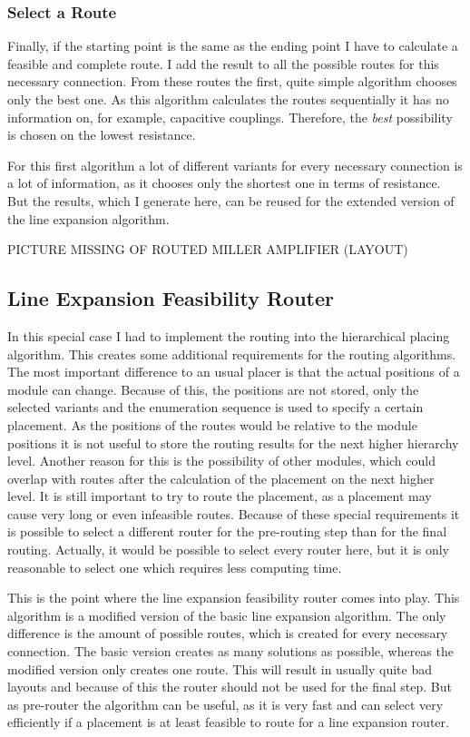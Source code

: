 \subsubsection{Select a Route}
Finally, if the starting point is the same as the ending point I have to calculate a feasible and complete route. I add the result to all the possible routes for this necessary connection. From these routes the first, quite simple algorithm chooses only the best one. As this algorithm calculates the routes sequentially it has no information on, for example, capacitive couplings. Therefore, the \emph{best} possibility is chosen on the lowest resistance.

For this first algorithm a lot of different variants for every necessary connection is a lot of information, as it chooses only the shortest one in terms of resistance. But the results, which I generate here, can be reused for the extended version of the line expansion algorithm.

PICTURE MISSING OF ROUTED MILLER AMPLIFIER (LAYOUT)

\subsection{Line Expansion Feasibility Router}
In this special case I had to implement the routing into the hierarchical placing algorithm. This creates some additional requirements for the routing algorithms. The most important difference to an usual placer is that the actual positions of a module can change. Because of this, the positions are not stored, only the selected variants and the enumeration sequence is used to specify a certain placement. As the positions of the routes would be relative to the module positions it is not useful to store the routing results for the next higher hierarchy level. Another reason for this is the possibility of other modules, which could overlap with routes after the calculation of the placement on the next higher level. It is still important to try to route the placement, as a placement may cause very long or even infeasible routes. Because of these special requirements it is possible to select a different router for the pre-routing step than for the final routing. Actually, it would be possible to select every router here, but it is only reasonable to select one which requires less computing time.

This is the point where the line expansion feasibility router comes into play. This algorithm is a modified version of the basic line expansion algorithm. The only difference is the amount of possible routes, which is created for every necessary connection. The basic version creates as many solutions as possible, whereas the modified version only creates one route. This will result in usually quite bad layouts and because of this the router should not be used for the final step. But as pre-router the algorithm can be useful, as it is very fast and can select very efficiently if a placement is at least feasible to route for a line expansion router.

